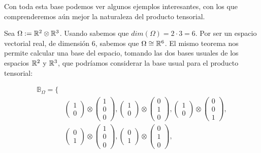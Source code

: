Con toda esta base podemos ver algunos ejemplos interesantes, con los que comprenderemos aún mejor la naturaleza del producto tensorial.

\begin{ejemplo}
    Sea $\Omega := \mathbb{R}^2 \otimes \mathbb{R}^3$. Usando  sabemos que $dim(\Omega) = 2 \cdot 3 = 6$. Por ser un espacio vectorial real, de dimensión $6$, sabemos que $\Omega \cong \mathbb{R}^6$. El mismo teorema nos permite calcular una base del espacio, tomando las dos bases usuales de los espacios $\mathbb{R}^2$ y $\mathbb{R}^3$, que podríamos considerar la base usual para el producto tensorial:

    \begin{equation}
    \begin{split}
    \mathbb{B}_{\Omega} = \{& \\
        & \begin{pmatrix}1 \\ 0 \end{pmatrix} \otimes \begin{pmatrix} 1 \\ 0 \\ 0 \end{pmatrix},
        \begin{pmatrix}1 \\ 0 \end{pmatrix} \otimes \begin{pmatrix} 0 \\ 1 \\ 0 \end{pmatrix},
        \begin{pmatrix}1 \\ 0 \end{pmatrix} \otimes \begin{pmatrix} 0 \\ 0 \\ 1 \end{pmatrix}, \\
        & \begin{pmatrix}0 \\ 1 \end{pmatrix} \otimes \begin{pmatrix} 1 \\ 0 \\ 0 \end{pmatrix},
        \begin{pmatrix}0 \\ 1 \end{pmatrix} \otimes \begin{pmatrix} 0 \\ 1 \\ 0 \end{pmatrix},

\end{split}
\end{equation}
\end{ejemplo}
